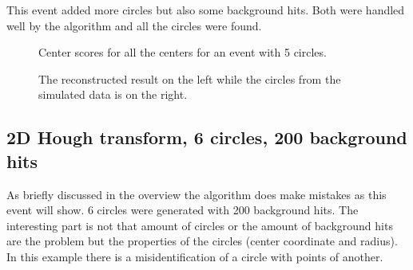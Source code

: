 \documentclass[11pt,twoside]{scrreprt}
\begin{document}
This event added more circles but also some background hits. Both were handled
well by the algorithm and all the circles were found.

\begin{figure}[htbp]
  \centering
  
  
  \caption{Center scores for all the centers for an event with 5 circles.}
  \label{fig:2d_5_circles_30_bg_radius}
\end{figure}
\begin{figure}
\centering
  \caption{The reconstructed result on the left while the circles from the simulated data is on the right.}
  \label{fig:2d_5c_results}
\end{figure}

\subsection{2D Hough transform, 6 circles, 200 background hits} %
\label{sub:2d_hough_transform_6_circles_200_background_hits}
As briefly discussed in the overview the algorithm does make mistakes as this event will show. 6 circles 
were generated with 200 background hits. The interesting part is not that amount of circles or the amount
of background hits are the problem but the properties of the circles (center coordinate and radius). In 
this example there is a misidentification of a circle with points of another.
\end{document}
